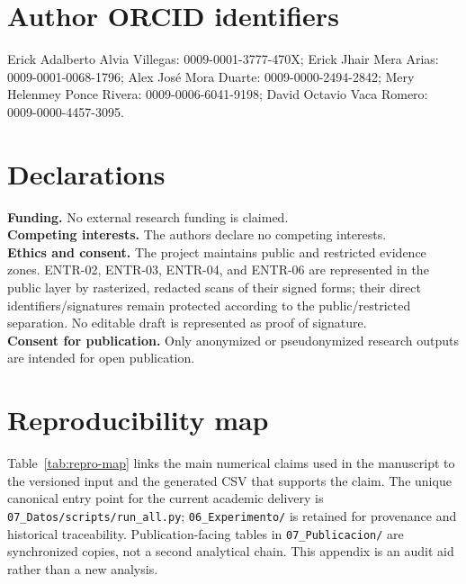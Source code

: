 \documentclass[pdflatex,sn-basic]{sn-jnl}
\begin{document}
\section*{Author ORCID identifiers}
Erick Adalberto Alvia Villegas: 0009-0001-3777-470X; Erick Jhair Mera Arias: 0009-0001-0068-1796; Alex Jos{\'e} Mora Duarte: 0009-0000-2494-2842; Mery Helenmey Ponce Rivera: 0009-0006-6041-9198; David Octavio Vaca Romero: 0009-0000-4457-3095.

\section*{Declarations}
\textbf{Funding.} No external research funding is claimed.\\
\textbf{Competing interests.} The authors declare no competing interests.\\
\textbf{Ethics and consent.} The project maintains public and restricted evidence zones. ENTR-02, ENTR-03, ENTR-04, and ENTR-06 are represented in the public layer by rasterized, redacted scans of their signed forms; their direct identifiers/signatures remain protected according to the public/restricted separation. No editable draft is represented as proof of signature.\\
\textbf{Consent for publication.} Only anonymized or pseudonymized research outputs are intended for open publication.


\appendix
\section{Reproducibility map}\label{app:repro}
Table~\ref{tab:repro-map} links the main numerical claims used in the manuscript to the versioned input and the generated CSV that supports the claim. The unique canonical entry point for the current academic delivery is \texttt{07\_Datos/scripts/run\_all.py}; \texttt{06\_Experimento/} is retained for provenance and historical traceability. Publication-facing tables in \texttt{07\_Publicacion/} are synchronized copies, not a second analytical chain. This appendix is an audit aid rather than a new analysis.
\end{document}
